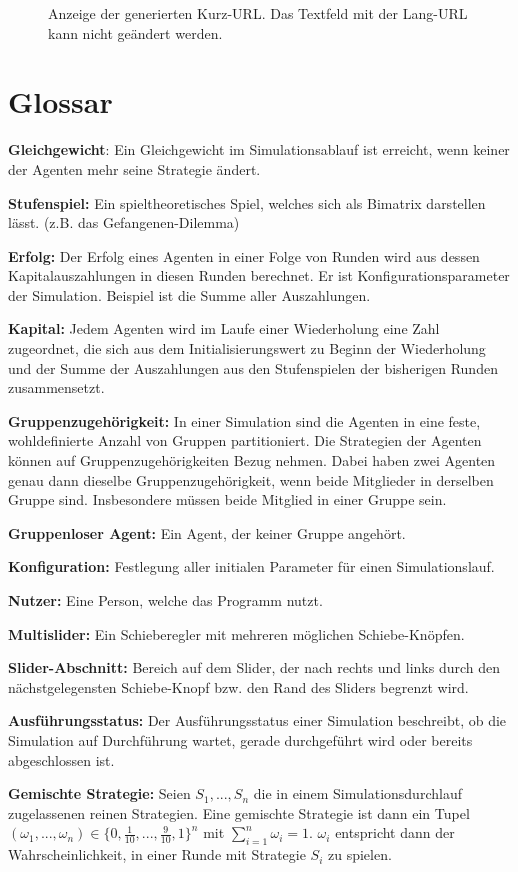 \documentclass[parskip=full,11pt,twoside]{scrartcl}
\begin{document}
\begin{figure}[hb]
\caption{\label{fig:generated}
Anzeige der generierten Kurz-URL.
Das Textfeld mit der Lang-URL kann nicht geändert werden.
}
\end{figure}

\section{Glossar}

\textbf{Gleichgewicht}:
Ein Gleichgewicht im Simulationsablauf ist erreicht, wenn keiner der Agenten mehr seine Strategie ändert.

\textbf{Stufenspiel:}
Ein spieltheoretisches Spiel, welches sich als Bimatrix darstellen lässt. (z.B. das Gefangenen-Dilemma)

\textbf{Erfolg:}
Der Erfolg eines Agenten in einer Folge von Runden wird aus dessen Kapitalauszahlungen in diesen Runden berechnet. Er ist Konfigurationsparameter der Simulation. Beispiel ist die Summe aller Auszahlungen.

\textbf{Kapital:}
Jedem Agenten wird im Laufe einer Wiederholung eine Zahl zugeordnet, die sich aus dem Initialisierungswert zu Beginn der Wiederholung und der Summe der Auszahlungen aus den Stufenspielen der bisherigen Runden zusammensetzt.

\textbf{Gruppenzugehörigkeit:}
In einer Simulation sind die Agenten in eine feste, wohldefinierte Anzahl von Gruppen partitioniert. Die Strategien der Agenten können auf Gruppenzugehörigkeiten Bezug nehmen. Dabei haben zwei Agenten genau dann dieselbe Gruppenzugehörigkeit, wenn beide Mitglieder in derselben Gruppe sind. Insbesondere müssen beide Mitglied in einer Gruppe sein.

\textbf{Gruppenloser Agent:}
Ein Agent, der keiner Gruppe angehört.

\textbf{Konfiguration:}
Festlegung aller initialen Parameter für einen Simulationslauf.

\textbf{Nutzer:}
Eine Person, welche das Programm nutzt.

\textbf{Multislider:}
Ein Schieberegler mit mehreren möglichen Schiebe-Knöpfen.

\textbf{Slider-Abschnitt:}
Bereich auf dem Slider, der nach rechts und links durch den nächstgelegensten Schiebe-Knopf bzw. den Rand des Sliders begrenzt wird.

\textbf{Ausführungsstatus:}
Der Ausführungsstatus einer Simulation beschreibt, ob die Simulation auf Durchführung wartet, gerade durchgeführt wird oder bereits abgeschlossen ist. 

\textbf{Gemischte Strategie:}
Seien \(S_1,...,S_n\) die in einem Simulationsdurchlauf zugelassenen reinen Strategien. Eine gemischte Strategie ist dann ein Tupel \((\omega_1,...,\omega_n) \in \{0,\frac{1}{10},...,\frac{9}{10},1\}^n\) mit \(\sum_{i=1}^n \omega_i = 1\). \(\omega_i\) entspricht dann der Wahrscheinlichkeit, in einer Runde mit Strategie \(S_i\) zu spielen.
\end{document}
